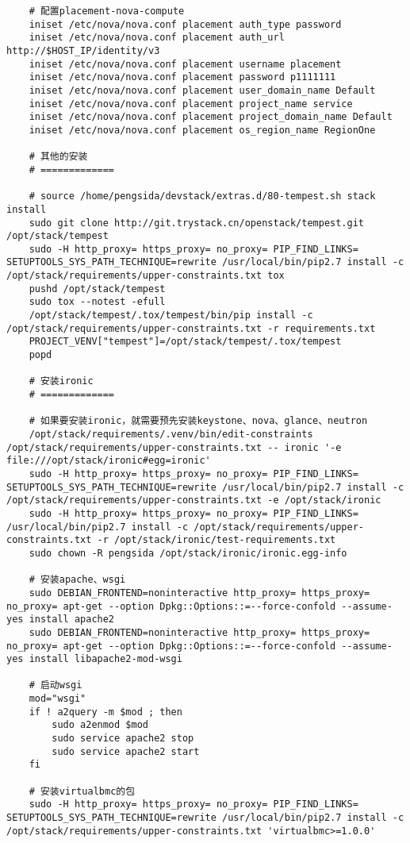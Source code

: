 \documentclass[a4paper,left=1.5cm,right=1.5cm,11pt]{article}
\begin{document}
\begin{lstlisting}
	# 配置placement-nova-compute
	iniset /etc/nova/nova.conf placement auth_type password
    iniset /etc/nova/nova.conf placement auth_url http://$HOST_IP/identity/v3
    iniset /etc/nova/nova.conf placement username placement
    iniset /etc/nova/nova.conf placement password p1111111
    iniset /etc/nova/nova.conf placement user_domain_name Default
    iniset /etc/nova/nova.conf placement project_name service
    iniset /etc/nova/nova.conf placement project_domain_name Default
    iniset /etc/nova/nova.conf placement os_region_name RegionOne

	# 其他的安装
	# =============

	# source /home/pengsida/devstack/extras.d/80-tempest.sh stack install
	sudo git clone http://git.trystack.cn/openstack/tempest.git /opt/stack/tempest
	sudo -H http_proxy= https_proxy= no_proxy= PIP_FIND_LINKS= SETUPTOOLS_SYS_PATH_TECHNIQUE=rewrite /usr/local/bin/pip2.7 install -c /opt/stack/requirements/upper-constraints.txt tox
	pushd /opt/stack/tempest
	sudo tox --notest -efull
	/opt/stack/tempest/.tox/tempest/bin/pip install -c /opt/stack/requirements/upper-constraints.txt -r requirements.txt	
	PROJECT_VENV["tempest"]=/opt/stack/tempest/.tox/tempest
	popd

	# 安装ironic
	# =============

	# 如果要安装ironic，就需要预先安装keystone、nova、glance、neutron
	/opt/stack/requirements/.venv/bin/edit-constraints /opt/stack/requirements/upper-constraints.txt -- ironic '-e file:///opt/stack/ironic#egg=ironic'
	sudo -H http_proxy= https_proxy= no_proxy= PIP_FIND_LINKS= SETUPTOOLS_SYS_PATH_TECHNIQUE=rewrite /usr/local/bin/pip2.7 install -c /opt/stack/requirements/upper-constraints.txt -e /opt/stack/ironic
	sudo -H http_proxy= https_proxy= no_proxy= PIP_FIND_LINKS= /usr/local/bin/pip2.7 install -c /opt/stack/requirements/upper-constraints.txt -r /opt/stack/ironic/test-requirements.txt
	sudo chown -R pengsida /opt/stack/ironic/ironic.egg-info

	# 安装apache、wsgi
	sudo DEBIAN_FRONTEND=noninteractive http_proxy= https_proxy= no_proxy= apt-get --option Dpkg::Options::=--force-confold --assume-yes install apache2
	sudo DEBIAN_FRONTEND=noninteractive http_proxy= https_proxy= no_proxy= apt-get --option Dpkg::Options::=--force-confold --assume-yes install libapache2-mod-wsgi

	# 启动wsgi
	mod="wsgi"
	if ! a2query -m $mod ; then
		sudo a2enmod $mod
		sudo service apache2 stop
		sudo service apache2 start
	fi

	# 安装virtualbmc的包
	sudo -H http_proxy= https_proxy= no_proxy= PIP_FIND_LINKS= SETUPTOOLS_SYS_PATH_TECHNIQUE=rewrite /usr/local/bin/pip2.7 install -c /opt/stack/requirements/upper-constraints.txt 'virtualbmc>=1.0.0'


\end{lstlisting}
\end{document}
